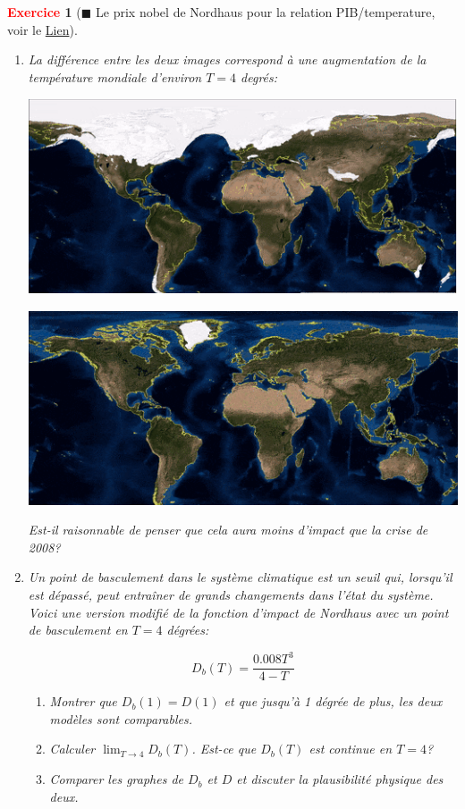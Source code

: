\documentclass[11pt]{article}
\theoremstyle{mythmstyle}
\newtheorem{exo}{\textcolor{red}{\textbf{Exercice}}}
\begin{document}
\begin{exo}[$\blacksquare$ Le prix nobel de Nordhaus pour la relation PIB/temperature, voir le \href{https://www.youtube.com/watch?v=vwwvZ8g5eHE}{Lien}]
\begin{enumerate}
\item La différence entre les deux images correspond à une augmentation de la température mondiale d'environ $T=4$ degrés:

\begin{center}
    \includegraphics[scale=0.5]{before}
\end{center}

\begin{center}
    \includegraphics[scale=0.5]{now}
\end{center}


Est-il raisonnable de penser que cela aura moins d'impact que la crise de 2008?
\medskip


\item Un point de basculement dans le système climatique est un seuil qui, lorsqu'il est dépassé, peut entraîner de grands changements dans l'état du système.  Voici une version modifié de la fonction d'impact de Nordhaus avec un point de basculement en $T=4$ dégrées:

$$
D_b(T)= \frac{0.008 T^3}{4-T}
$$

\begin{enumerate}
    \item Montrer que $D_b(1)=D(1)$ et que jusqu'à 1 dégrée de plus, les deux modèles sont comparables.
    \item Calculer $\lim_{T\to 4} D_b(T)$. Est-ce que $D_b(T)$ est continue en $T=4$?
    \item Comparer les graphes de $D_b$ et $D$ et discuter la  plausibilité physique des deux.
\end{enumerate}


\end{enumerate}
\end{exo}
\end{document}
